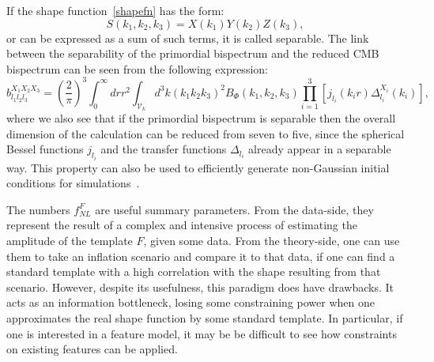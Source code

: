 \documentclass[a4paper,12pt]{extarticle}
\newcommand{\fnl}{f_{NL}}
\begin{document}
If the shape function~\eqref{shapefn} has the form:
\begin{equation}\label{sepXYZ}
S(k_1,k_2,k_3) = X(k_1)Y(k_2)Z(k_3),
\end{equation}
or can be expressed as a sum of such terms,
it is called separable.
The link between the separability of the primordial bispectrum
and the reduced CMB bispectrum can be seen from the following expression:
\begin{equation}
\label{eq:reduced_cmb}
b^{X_1X_2X_3}_{l_1l_2l_3} = \left(\frac{2}{\pi}\right)^3\int_{0}^{\infty}drr^2\int_{\mathcal{V}_k}d^3k (k_1k_2k_3)^2 B_{\Phi}(k_1,k_2,k_3)\prod_{i=1}^{3}\left[j_{l_i}(k_ir)\Delta^{X_i}_{l_i}(k_i)\right],
\end{equation}
where we also see that if the primordial bispectrum is separable
then the overall dimension
of the calculation can be reduced from seven to five, 
since the spherical Bessel functions $j_{l_i}$ and the
transfer functions $\Delta_{l_i}$ already appear in a separable way.
This property can also be used to
efficiently generate non-Gaussian initial conditions
for simulations~\cite{Scoccimarro_2012}.


The numbers $\fnl^F$ are useful summary parameters.
From the data-side, they represent the result of
a complex and intensive process
of estimating the amplitude of the template $F$,
given some data. From the theory-side, one
can use them to take an inflation scenario and compare it
to that data, if one can find a standard template
with a high correlation with the shape resulting
from that scenario.
However, despite its usefulness, this paradigm does
have drawbacks. It acts as an information bottleneck,
losing some constraining power when one approximates
the real shape function by some standard template.
In particular, if one is interested in a feature model,
it may be be difficult to see how constraints on existing
features can be applied.
\end{document}
